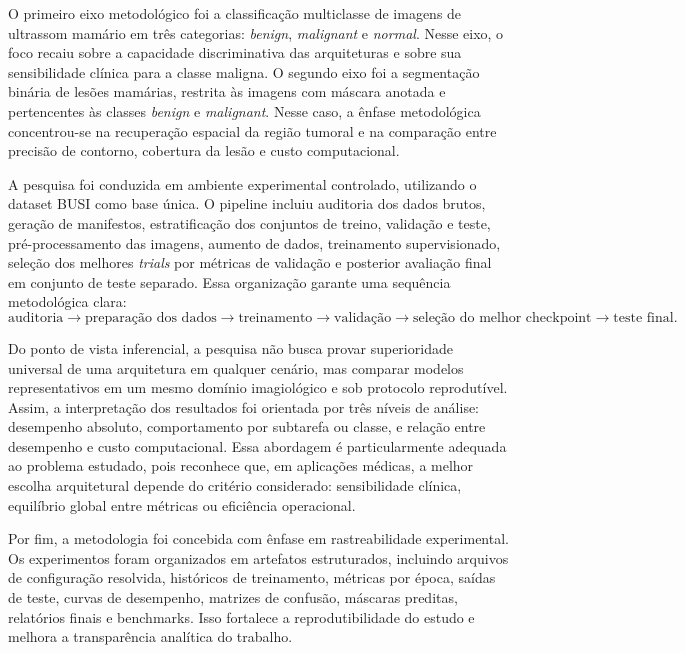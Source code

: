 \documentclass[tcc,capa]{texufpel}
\begin{document}
O primeiro eixo metodológico foi a classificação multiclasse de imagens de ultrassom mamário em três categorias: \textit{benign}, \textit{malignant} e \textit{normal}. Nesse eixo, o foco recaiu sobre a capacidade discriminativa das arquiteturas e sobre sua sensibilidade clínica para a classe maligna. O segundo eixo foi a segmentação binária de lesões mamárias, restrita às imagens com máscara anotada e pertencentes às classes \textit{benign} e \textit{malignant}. Nesse caso, a ênfase metodológica concentrou-se na recuperação espacial da região tumoral e na comparação entre precisão de contorno, cobertura da lesão e custo computacional.

A pesquisa foi conduzida em ambiente experimental controlado, utilizando o dataset BUSI como base única. O pipeline incluiu auditoria dos dados brutos, geração de manifestos, estratificação dos conjuntos de treino, validação e teste, pré-processamento das imagens, aumento de dados, treinamento supervisionado, seleção dos melhores \textit{trials} por métricas de validação e posterior avaliação final em conjunto de teste separado. Essa organização garante uma sequência metodológica clara:
\begin{equation}
	\text{auditoria} \rightarrow \text{preparação dos dados} \rightarrow \text{treinamento} \rightarrow \text{validação} \rightarrow \text{seleção do melhor checkpoint} \rightarrow \text{teste final}.
\end{equation}

Do ponto de vista inferencial, a pesquisa não busca provar superioridade universal de uma arquitetura em qualquer cenário, mas comparar modelos representativos em um mesmo domínio imagiológico e sob protocolo reprodutível. Assim, a interpretação dos resultados foi orientada por três níveis de análise: desempenho absoluto, comportamento por subtarefa ou classe, e relação entre desempenho e custo computacional. Essa abordagem é particularmente adequada ao problema estudado, pois reconhece que, em aplicações médicas, a melhor escolha arquitetural depende do critério considerado: sensibilidade clínica, equilíbrio global entre métricas ou eficiência operacional.

Por fim, a metodologia foi concebida com ênfase em rastreabilidade experimental. Os experimentos foram organizados em artefatos estruturados, incluindo arquivos de configuração resolvida, históricos de treinamento, métricas por época, saídas de teste, curvas de desempenho, matrizes de confusão, máscaras preditas, relatórios finais e benchmarks. Isso fortalece a reprodutibilidade do estudo e melhora a transparência analítica do trabalho.
\end{document}
